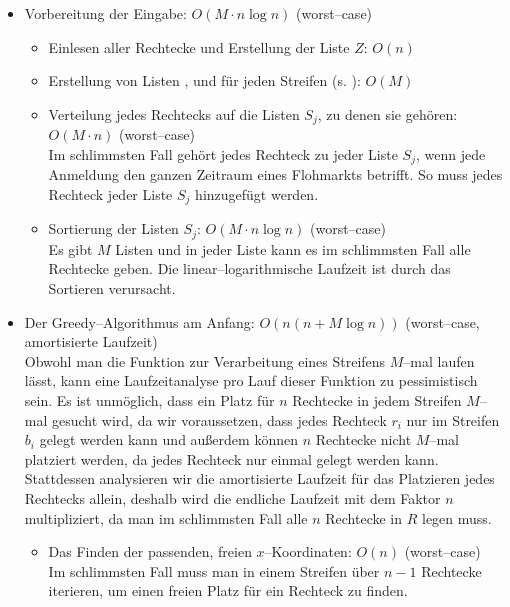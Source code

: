 \begin{itemize}
	\item Vorbereitung der Eingabe: $O(M \cdot n \log n)$ (worst--case)
	\begin{itemize}
		\item Einlesen aller Rechtecke und Erstellung der Liste $Z$: $O(n)$

		\item Erstellung von Listen ,  und 
		für jeden Streifen (s. ): $O(M)$

		\item Verteilung jedes Rechtecks auf die Listen $S_j$, zu denen sie gehören: $O(M \cdot n)$ (worst--case)\\
		Im schlimmsten Fall gehört jedes Rechteck zu jeder Liste $S_j$, wenn jede Anmeldung
		den ganzen Zeitraum eines Flohmarkts betrifft.
		So muss jedes Rechteck jeder Liste $S_j$ hinzugefügt werden.

		\item Sortierung der Listen $S_j$: $O(M \cdot n \log n)$ (worst--case)\\
		Es gibt $M$ Listen und in jeder Liste kann es im schlimmsten Fall
		alle Rechtecke geben. Die linear--logarithmische Laufzeit
		ist durch das Sortieren verursacht.
	\end{itemize}

	\item Der Greedy--Algorithmus am Anfang: $O(n(n + M \log n))$ (worst--case, amortisierte Laufzeit)\\
	Obwohl man die Funktion zur Verarbeitung eines Streifens $M$--mal 
	laufen lässt, kann eine Laufzeitanalyse pro Lauf dieser Funktion zu pessimistisch sein.
	Es ist unmöglich, dass ein Platz für $n$ Rechtecke in jedem Streifen $M$--mal gesucht wird,
	da wir voraussetzen, dass jedes Rechteck $r_i$ nur im Streifen $b_i$ gelegt werden kann
	und außerdem können $n$ Rechtecke nicht $M$--mal platziert werden, da jedes Rechteck
	nur einmal gelegt werden kann.
	Stattdessen analysieren wir die amortisierte Laufzeit für das Platzieren jedes Rechtecks allein,
	deshalb wird die endliche Laufzeit mit dem Faktor $n$ multipliziert, da man im schlimmsten Fall
	alle $n$ Rechtecke in $R$ legen muss.

	\begin{itemize}
		\item Das Finden der passenden, freien $x$--Koordinaten: $O(n)$ (worst--case)\\
		Im schlimmsten Fall muss man in einem Streifen über $n-1$ Rechtecke iterieren,
		um einen freien Platz für ein Rechteck zu finden.


\end{itemize}
\end{itemize}
